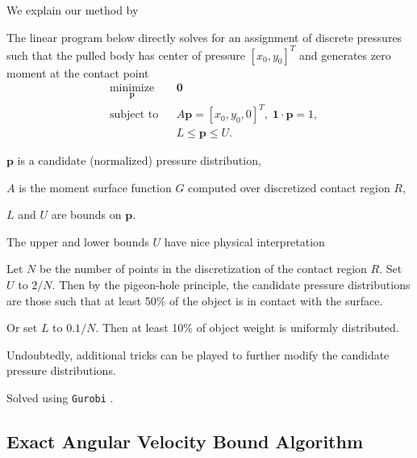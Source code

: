 \documentclass[conference]{IEEEtran}
\begin{document}
We explain our method by 

\begin{inparaenum}
\item The linear program below directly solves for an assignment of
  discrete pressures such that the pulled body has center of pressure
  $[x_0,y_0]^T$ and generates zero moment at the contact point
  \begin{equation}
    \begin{aligned}
      & \underset{\mathbf{p}}{\text{minimize}}
      & & \mathbf{0} \\
      & \text{subject to}
      & & A\mathbf{p} = [x_0,y_0,0]^T,\; \mathbf{1}\cdot\mathbf{p} = 1, \\
      & & & L \leq \mathbf{p} \leq U.
    \end{aligned} \label{eq:lin-prog-PiCH}
  \end{equation}
  \begin{inparaenum}
  \item $\mathbf{p}$ is a candidate (normalized) pressure distribution,
  \item $A$ is the moment surface function $G$ computed over
    discretized contact region $R$,
  \item $L$ and $U$ are bounds on $\mathbf{p}$.
  \end{inparaenum}
\item The upper and lower bounds $U$ have nice physical interpretation 
  \begin{inparaenum}
  \item Let $N$ be the number of points in the discretization of the
    contact region $R$. Set $U$ to $2/N$. Then by the pigeon-hole
    principle, the candidate pressure distributions are those such
    that at least 50\% of the object is in contact with the surface.
  \item Or set $L$ to $0.1/N$. Then at least 10\% of object weight is
    uniformly distributed.
  \item Undoubtedly, additional tricks can be played to further modify
    the candidate pressure distributions.
  \end{inparaenum}
\item Solved using \texttt{Gurobi} \cite{gurobi}.
\end{inparaenum}

\subsection{Exact Angular Velocity Bound
  Algorithm}\label{sec:exact-ang-vel-bound-alg}
\end{document}
